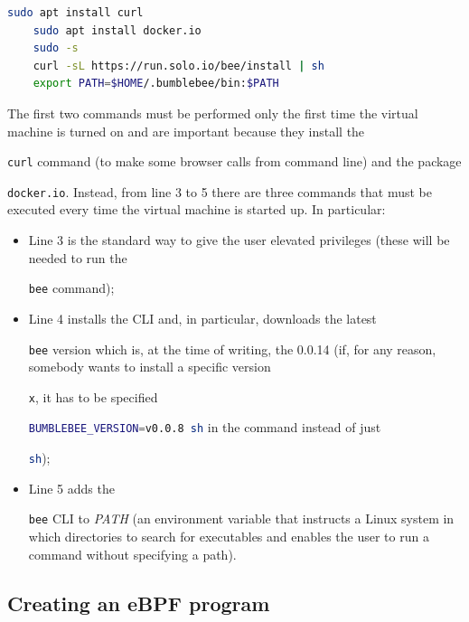 \begin{lstlisting}[style=commandline, language=bash, caption={\colorbox{backcolour}{\lstinline[style=commandline, language=bash]|bee|} installation commands.}]
	sudo apt install curl
	sudo apt install docker.io 
	sudo -s
	curl -sL https://run.solo.io/bee/install | sh 
	export PATH=$HOME/.bumblebee/bin:$PATH
\end{lstlisting}

The first two commands must be performed only the first time the virtual machine is turned on and are important because they install the \raggedright\colorbox{backcolour}{\lstinline[style=commandline, language=bash]|curl|} command (to make some browser calls from command line) and the package \raggedright\colorbox{backcolour}{\lstinline[style=commandline, language=bash]|docker.io|}.
Instead, from line 3 to 5 there are three commands that must be executed every time the virtual machine is started up.
In particular:

\begin{itemize}
	\item 
		Line 3 is the standard way to give the user elevated privileges (these will be needed to run the \raggedright\colorbox{backcolour}{\lstinline[style=commandline, language=bash]|bee|} command);
	\item 
		Line 4 installs the CLI and, in particular, downloads the latest \raggedright\colorbox{backcolour}{\lstinline[style=commandline, language=bash]|bee|} version which is, at the time of writing, the 0.0.14 (if, for any reason, somebody wants to install a specific version \raggedright\colorbox{backcolour}{\lstinline[style=commandline, language=bash]|x|}, it has to be specified \raggedright\colorbox{backcolour}{\lstinline[style=commandline, language=bash]|BUMBLEBEE_VERSION=v0.0.8 sh|} in the command instead of just \raggedright\colorbox{backcolour}{\lstinline[style=commandline, language=bash]|sh|});
	\item 
		Line 5 adds the \raggedright\colorbox{backcolour}{\lstinline[style=commandline, language=bash]|bee|} CLI to \textit{PATH} (an environment variable that instructs a Linux system in which directories to search for executables and enables the user to run a command without specifying a path).
\end{itemize}

\subsection{Creating an eBPF program}

